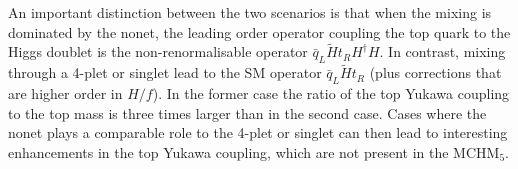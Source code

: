 %
%



An important distinction between the two scenarios is that when the
mixing is dominated by the nonet, the leading order operator coupling
the top quark to the Higgs doublet is the non-renormalisable operator
${\bar q}_L \tilde{H} t_R H^\dagger H$.  In contrast, mixing through a
4-plet or singlet lead to the SM operator ${\bar q}_L \tilde{H} t_R$
(plus corrections that are higher order in $H/f$).  In the former case
the ratio of the top Yukawa coupling to the top mass is three times
larger than in the second case.  Cases where the nonet plays a
comparable role to the 4-plet or singlet can then lead to interesting
enhancements in the top Yukawa coupling, which are not present in the
MCHM$_5$.

